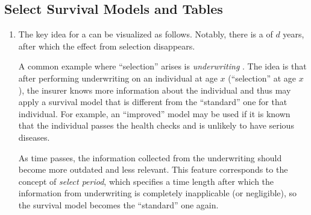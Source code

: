 \subsection{Select Survival Models and Tables}
\begin{enumerate}
\item The key idea for a  can be visualized as
follows. Notably, there is a  of \(d\) years, after which
the effect from selection disappears.
\begin{center}
\end{center}

A common example where ``selection'' arises is \emph{underwriting}
. The idea is that after performing underwriting on an
individual at age \(x\) (``selection'' at age \(x\)), the insurer knows more
information about the individual and thus may apply a survival model that is
different from the ``standard'' one for that individual. For example, an
``improved'' model may be used if it is known that the individual passes the
health checks and is unlikely to have serious diseases.

As time passes, the information collected from the underwriting should become
more outdated and less relevant. This feature corresponds to the concept of
\emph{select period}, which specifies a time length after which the information
from underwriting is completely inapplicable (or negligible), so the survival
model becomes the ``standard'' one again.


\end{enumerate}
